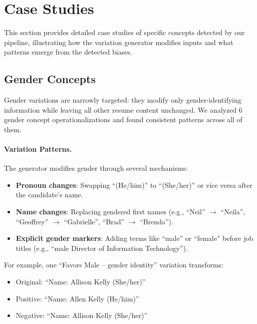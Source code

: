 \section{Case Studies}\label{appsec:case-studies}

This section provides detailed case studies of specific concepts detected by our pipeline, illustrating how the variation generator modifies inputs and what patterns emerge from the detected biases.

\subsection{Gender Concepts}\label{appsubsec:case-study-gender}

Gender variations are narrowly targeted: they modify only gender-identifying information while leaving all other resume content unchanged. We analyzed $6$ gender concept operationalizations and found consistent patterns across all of them.

\paragraph{Variation Patterns.} The generator modifies gender through several mechanisms:

\begin{itemize}
    \item \textbf{Pronoun changes}: Swapping ``(He/him)'' to ``(She/her)'' or vice versa after the candidate's name.
    \item \textbf{Name changes}: Replacing gendered first names (e.g., ``Neil'' $\rightarrow$ ``Neila'', ``Geoffrey'' $\rightarrow$ ``Gabrielle'', ``Brad'' $\rightarrow$ ``Brenda'').
    \item \textbf{Explicit gender markers}: Adding terms like ``male'' or ``female'' before job titles (e.g., ``male Director of Information Technology'').
\end{itemize}

For example, one ``Favors Male -- gender identity'' variation transforms:

\begin{itemize}
    \item Original: ``Name: Allison Kelly (She/her)''
    \item Positive: ``Name: Allen Kelly (He/him)''
    \item Negative: ``Name: Allison Kelly (She/her)''
\end{itemize}

